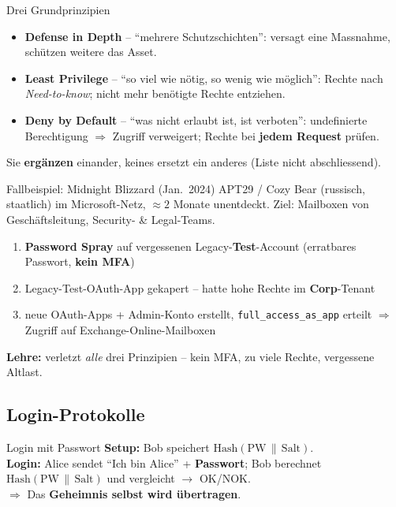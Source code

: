 \documentclass[a4paper, fontsize=7pt]{scrartcl}
\begin{document}
\begin{mainbox}{Drei Grundprinzipien}
\begin{itemize}
    \item \textbf{Defense in Depth} -- ``mehrere Schutzschichten'': versagt
          eine Massnahme, schützen weitere das Asset.
    \item \textbf{Least Privilege} -- ``so viel wie nötig, so wenig wie
          möglich'': Rechte nach \emph{Need-to-know}; nicht mehr benötigte
          Rechte entziehen.
    \item \textbf{Deny by Default} -- ``was nicht erlaubt ist, ist verboten'':
          undefinierte Berechtigung $\Rightarrow$ Zugriff verweigert;
          Rechte bei \textbf{jedem Request} prüfen.
\end{itemize}
Sie \textbf{ergänzen} einander, keines ersetzt ein anderes (Liste nicht
abschliessend).
\end{mainbox}

\begin{subbox}{Fallbeispiel: Midnight Blizzard (Jan.\ 2024)}
APT29 / Cozy Bear (russisch, staatlich) im Microsoft-Netz, $\approx 2$
Monate unentdeckt. Ziel: Mailboxen von Geschäftsleitung, Security- \&
Legal-Teams.
\begin{enumerate}
    \item \textbf{Password Spray} auf vergessenen Legacy-\textbf{Test}-Account
          (erratbares Passwort, \textbf{kein MFA})
    \item Legacy-Test-OAuth-App gekapert -- hatte hohe Rechte im
          \textbf{Corp}-Tenant
    \item neue OAuth-Apps + Admin-Konto erstellt, \texttt{full\_access\_as\_app}
          erteilt $\Rightarrow$ Zugriff auf Exchange-Online-Mailboxen
\end{enumerate}
\textbf{Lehre:} verletzt \emph{alle} drei Prinzipien -- kein MFA, zu viele
Rechte, vergessene Altlast.
\end{subbox}

\subsection{Login-Protokolle}

\begin{mainbox}{Login mit Passwort}
\textbf{Setup:} Bob speichert $\mathrm{Hash}(\text{PW} \,\|\, \text{Salt})$.\\
\textbf{Login:} Alice sendet ``Ich bin Alice'' + \textbf{Passwort}; Bob
berechnet $\mathrm{Hash}(\text{PW} \,\|\, \text{Salt})$ und vergleicht
$\to$ OK/NOK.\\
$\Rightarrow$ Das \textbf{Geheimnis selbst wird übertragen}.
\end{mainbox}
\end{document}
